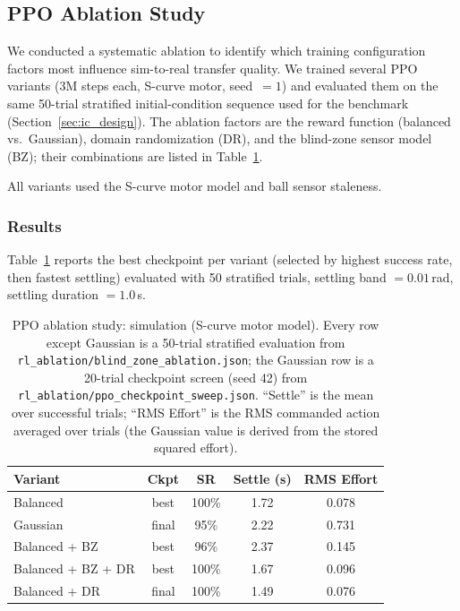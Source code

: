 \subsection{PPO Ablation Study}
\label{appendix:ppo_ablation}

We conducted a systematic ablation to identify which training
configuration factors most influence sim-to-real transfer quality.
We trained several PPO variants (3M steps each, S-curve motor,
seed~$=1$) and evaluated them on the same 50-trial stratified
initial-condition sequence used for the benchmark
(Section~\ref{sec:ic_design}). The ablation factors are the reward
function (balanced vs.~Gaussian), domain randomization (DR), and the
blind-zone sensor model (BZ); their combinations are listed in
Table~\ref{tab:ppo_ablation}.

All variants used the S-curve motor model and ball sensor staleness.

\subsubsection{Results}

Table~\ref{tab:ppo_ablation} reports the best checkpoint per variant
(selected by highest success rate, then fastest settling) evaluated
with 50 stratified trials, settling band $= 0.01$\,rad,
settling duration $= 1.0$\,s.

\begin{table}[!t]
\centering
\renewcommand{\arraystretch}{1.15}
\caption{PPO ablation study: simulation (S-curve motor model). Every row
  except Gaussian is a 50-trial stratified evaluation from
  \texttt{rl\_ablation/blind\_zone\_ablation.json}; the Gaussian row is a
  20-trial checkpoint screen (seed 42) from
  \texttt{rl\_ablation/ppo\_checkpoint\_sweep.json}. ``Settle'' is the mean
  over successful trials; ``RMS Effort'' is the RMS commanded action
  averaged over trials (the Gaussian value is derived from the stored
  squared effort).}
\label{tab:ppo_ablation}
\begin{tabular}{lcccc}
\toprule
\textbf{Variant} & \textbf{Ckpt} & \textbf{SR} & \textbf{Settle (s)}
  & \textbf{RMS Effort} \\
\midrule
Balanced          & best  & 100\% & 1.72 & 0.078 \\
Gaussian          & final &  95\% & 2.22 & 0.731 \\
Balanced + BZ     & best  &  96\% & 2.37 & 0.145 \\
Balanced + BZ + DR& best  & 100\% & 1.67 & 0.096 \\
Balanced + DR     & final & 100\% & 1.49 & 0.076 \\
\bottomrule
\end{tabular}
\end{table}

